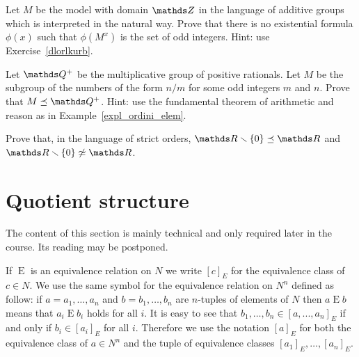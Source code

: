 \begin{exercise}\label{ex_Z_odd_existential}
Let $M$ be the model with domain $\ZZ$ in the language of additive groups which is interpreted in the natural way.
Prove that there is no existential formula $\phi(x)$ such that $\phi(M^x)$ is the set of odd integers.
Hint: use Exercise~\ref{dlorlkurb}.
\end{exercise}


\begin{exercise}\label{ex_Q_odd}
Let $\QQ^+$ be the multiplicative group of positive rationals.
Let $M$ be the subgroup of the numbers of the form $n/m$ for some odd integers $m$ and $n$.
Prove that $M\preceq\QQ^+$.
Hint: use the fundamental theorem of arithmetic and reason as in Example~\ref{expl_ordini_elem}.
\end{exercise}

\begin{exercise} 
  Prove that, in the language of strict orders, $\RR\sm\{0\}\preceq \RR$ and $\RR\sm\{0\}\not\simeq \RR$.
\end{exercise}
  
\section{Quotient structure}\label{quotient}
\def\ceq#1#2#3{\parbox[b]{20ex}{$\displaystyle #1$}\parbox[b]{6ex}{\hfil$#2$}$\displaystyle #3$}

The content of this section is mainly technical and only required later in the course.
Its reading may be postponed.


If $\mathrel{E}$ is an equivalence relation on $N$ we write \emph{$[c]_E$\/} for the equivalence class of $c\in N$.
We use the same symbol for the equivalence relation on $N^n$ defined as follow: if $a=a_1,\dots,a_n$ and $b=b_1,\dots,b_n$ are $n$-tuples of elements of $N$ then \emph{$a\mathrel{E} b$\/} means that  $a_i\mathrel{E} b_i$ holds for all $i$.
It is easy to see that $b_1,\dots,b_n\in [a, ..., a_n]_E$ if and only if $b_i \in [a_i]_E$ for all $i$.
 Therefore we use the notation \emph{$[a]_E$\/} for both the equivalence class of $a\in N^n$ and the tuple of equivalence classes $[a_1]_E,\dots,[a_n]_E$.

